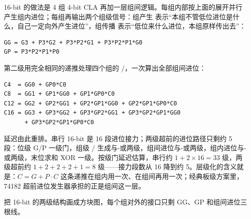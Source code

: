 16-bit 的做法是 4 组 4-bit CLA 再加一层组间逻辑。每组内部按上面的展开并行产生组内进位；每组再输出两个组级信号：组产生  表示“本组不管低位进位是什么，自己一定向外产生进位”，组传播  表示“低位来什么进位，本组原样传出去”：

\begin{lstlisting}
GG = G3 + P3*G2 + P3*P2*G1 + P3*P2*P1*G0
GP = P3*P2*P1*P0
\end{lstlisting}

第二级用完全相同的递推处理四个组的 /，一次算出全部组间进位：

\begin{lstlisting}
C4  = GG0 + GP0*C0
C8  = GG1 + GP1*GG0 + GP1*GP0*C0
C12 = GG2 + GP2*GG1 + GP2*GP1*GG0 + GP2*GP1*GP0*C0
C16 = GG3 + GP3*GG2 + GP3*GP2*GG1 + GP3*GP2*GP1*GG0
      + GP3*GP2*GP1*GP0*C0
\end{lstlisting}

延迟由此重排。串行 16-bit 是 16 段进位接力；两级超前的进位路径只剩约 5 段：位级 G/P 一级门，组级 / 生成与-或两级，组间进位与-或两级，组内进位与-或两级，末位求和 XOR 一级。按级门延迟估算，串行约 $1 + 2 \times 16 = 33$ 级，两级超前约 $1+2+2+2+1=8$ 级——接力段数从 16 降到约 5。层级化的含义就是：$C = G + P\cdot C$ 这条递推在组内用一次、在组间再用一次；经典板级方案里，74182 超前进位发生器承担的正是组间这一层。

把 16-bit 的两级结构画成方块图，每个组对外的接口只剩 GG、GP 和组间进位三根线。

